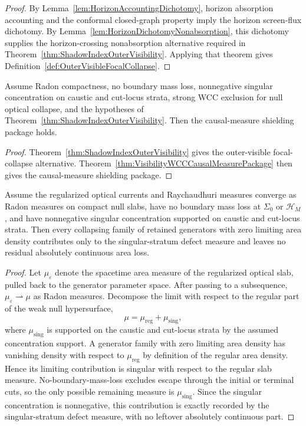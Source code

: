 \begin{proof}
By Lemma~\ref{lem:HorizonAccountingDichotomy}, horizon absorption accounting and the conformal closed-graph property imply the horizon screen-flux dichotomy. By Lemma~\ref{lem:HorizonDichotomyNonabsorption}, this dichotomy supplies the horizon-crossing nonabsorption alternative required in Theorem~\ref{thm:ShadowIndexOuterVisibility}. Applying that theorem gives Definition~\ref{def:OuterVisibleFocalCollapse}.
\end{proof}

\begin{corollary}\label{cor:ShadowRouteCausalMeasurePackage}
Assume Radon compactness, no boundary mass loss, nonnegative singular concentration on caustic and cut-locus strata, strong WCC exclusion for null optical collapse, and the hypotheses of Theorem~\ref{thm:ShadowIndexOuterVisibility}. Then the causal-measure shielding package holds.
\end{corollary}

\begin{proof}
Theorem~\ref{thm:ShadowIndexOuterVisibility} gives the outer-visible focal-collapse alternative. Theorem~\ref{thm:VisibilityWCCCausalMeasurePackage} then gives the causal-measure shielding package.
\end{proof}

\begin{lemma}\label{lem:RadonDefectAccounting}
Assume the regularized optical currents and Raychaudhuri measures converge as Radon measures on compact null slabs, have no boundary mass loss at $\Sigma_0$ or $\mathcal H_M$, and have nonnegative singular concentration supported on caustic and cut-locus strata. Then every collapsing family of retained generators with zero limiting area density contributes only to the singular-stratum defect measure and leaves no residual absolutely continuous area loss.
\end{lemma}

\begin{proof}
Let $\mu_\varepsilon$ denote the spacetime area measure of the regularized optical slab, pulled back to the generator parameter space. After passing to a subsequence, $\mu_\varepsilon\rightharpoonup\mu$ as Radon measures. Decompose the limit with respect to the regular part of the weak null hypersurface,
\[
    \mu=\mu_{\mathrm{reg}}+\mu_{\mathrm{sing}},
\]
where $\mu_{\mathrm{sing}}$ is supported on the caustic and cut-locus strata by the assumed concentration support. A generator family with zero limiting area density has vanishing density with respect to $\mu_{\mathrm{reg}}$ by definition of the regular area density. Hence its limiting contribution is singular with respect to the regular slab measure. No-boundary-mass-loss excludes escape through the initial or terminal cuts, so the only possible remaining measure is $\mu_{\mathrm{sing}}$. Since the singular concentration is nonnegative, this contribution is exactly recorded by the singular-stratum defect measure, with no leftover absolutely continuous part.
\end{proof}

